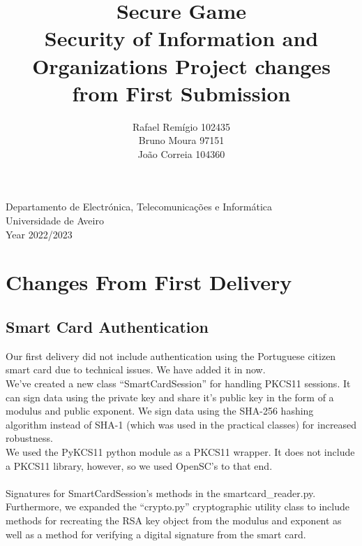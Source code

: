 \documentclass[11pt]{article}
\begin{document}
\begin{titlepage}

\title{%
  Secure Game \\
  \large  Security of Information and Organizations Project changes from First Submission\\}

\author{Rafael Remígio 102435 \\ Bruno Moura 97151\\ João Correia 104360}

\maketitle

\vfill
\begin{center}

	Departamento de Electrónica, Telecomunicações e Informática\\
       Universidade de Aveiro\\ Year 2022/2023
\end{center}



\end{titlepage}

\tableofcontents

\clearpage


\section{Changes From First Delivery}\label{changes}
\subsection{Smart Card Authentication}\label{smart card authentication}
Our first delivery did not include authentication using the Portuguese citizen smart card due to technical issues. We have added it in now.\\
We’ve created a new class “SmartCardSession” for handling PKCS11 sessions. It can sign data using the private key and share it’s public key in the form of a modulus and public exponent. We sign data using the SHA-256 hashing algorithm instead of SHA-1 (which was used in the practical classes) for increased robustness.\\
We used the PyKCS11 python module as a PKCS11 wrapper. It does not include a PKCS11 library, however, so we used OpenSC’s to that end.\\ 
\\
Signatures for SmartCardSession's methods in the smartcard\_reader.py.\\ 
Furthermore, we expanded the “crypto.py” cryptographic utility class to include methods for recreating  the RSA key object from the modulus and exponent as well as a method for verifying a digital signature from the smart card.
\end{document}
